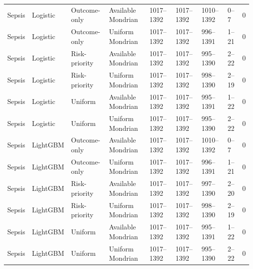 \begin{longtable}{L{1cm}L{1.6cm}L{2.4cm}L{3.1cm}llllL{1.2cm}}
Sepsis & Logistic & Outcome-only & Available Mondrian & 1017--1392 & 1017--1392 & 1010--1392 & 0--7 & 0 \\
Sepsis & Logistic & Outcome-only & Uniform Mondrian & 1017--1392 & 1017--1392 & 996--1391 & 1--21 & 0 \\
Sepsis & Logistic & Risk-priority & Available Mondrian & 1017--1392 & 1017--1392 & 995--1390 & 2--22 & 0 \\
Sepsis & Logistic & Risk-priority & Uniform Mondrian & 1017--1392 & 1017--1392 & 998--1390 & 2--19 & 0 \\
Sepsis & Logistic & Uniform & Available Mondrian & 1017--1392 & 1017--1392 & 995--1391 & 1--22 & 0 \\
Sepsis & Logistic & Uniform & Uniform Mondrian & 1017--1392 & 1017--1392 & 995--1390 & 2--22 & 0 \\
Sepsis & LightGBM & Outcome-only & Available Mondrian & 1017--1392 & 1017--1392 & 1010--1392 & 0--7 & 0 \\
Sepsis & LightGBM & Outcome-only & Uniform Mondrian & 1017--1392 & 1017--1392 & 996--1391 & 1--21 & 0 \\
Sepsis & LightGBM & Risk-priority & Available Mondrian & 1017--1392 & 1017--1392 & 997--1390 & 2--20 & 0 \\
Sepsis & LightGBM & Risk-priority & Uniform Mondrian & 1017--1392 & 1017--1392 & 998--1390 & 2--19 & 0 \\
Sepsis & LightGBM & Uniform & Available Mondrian & 1017--1392 & 1017--1392 & 995--1391 & 1--22 & 0 \\
Sepsis & LightGBM & Uniform & Uniform Mondrian & 1017--1392 & 1017--1392 & 995--1390 & 2--22 & 0 \\
\end{longtable}
